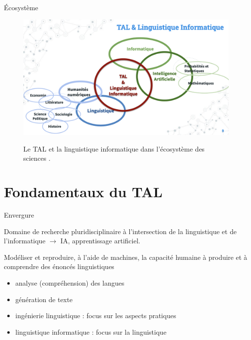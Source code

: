 \documentclass[xetex,xcolor={table,usenames,dvipsnames}]{beamer}
\begin{document}
\begin{frame}{Écosystème}
	\begin{figure}[h] %
		\centering
		\includegraphics[width=0.80\linewidth]{img/ecosysteme.png}
		\label{fig:ecosysteme}
		\caption{Le \textsc{TAL} et la linguistique informatique dans l'écosystème des sciences \citep{boisson}.}
	\end{figure}
\end{frame}


\section{Fondamentaux du \textsc{TAL}}

\begin{frame}{Envergure}
	\begin{block}{\vspace{-6mm}}
			\justifying
		Domaine de recherche pluridisciplinaire à l'intersection de la linguistique et de l'informatique $\rightarrow$ \textsc{IA}, apprentissage artificiel.
	\end{block}
	\vspace{-4mm}
		\begin{flushright}
		\citep{poibeau}
	\end{flushright}
	
	\begin{block}{\vspace{-6mm}}
			\justifying
	Modéliser et reproduire, à
l’aide de machines, la capacité humaine à
produire et à comprendre des énoncés linguistiques
	\end{block}
	\vspace{-4mm}
		\begin{flushright}
	\citep{yvon2010petite}
\end{flushright}

	\begin{itemize}
		\item analyse (compréhension) des langues
		\item génération de texte
		\item ingénierie linguistique : focus sur les aspects pratiques
		\item linguistique informatique : focus sur la linguistique
	\end{itemize}
\end{frame}
\end{document}
